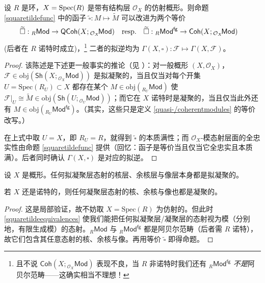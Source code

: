 \begin{Pro}\label{squaretildefunctocoherent}
设 $R$ 是环，$X=\textup{Spec}(R)$ 是带有结构层 $\mathcal{O}_X$ 的仿射概形。则命题 \ref{squaretildefunc} 中的函子 $\widetilde{\square}:M\mapsto\widetilde{M}$ 可以改进为两个等价
\begin{equation}\label{squaretildeequivalences}
	\mkern-18mu\widetilde{\square}:{}_R\mathsf{Mod}\rightarrow\mathsf{QCoh}(X;{}_{\mathcal{O}_X}\!\mathsf{Mod})\quad\text{resp.}\quad \widetilde{\square}:{}_R\mathsf{Mod}^\mathsf{fg}\rightarrow\mathsf{Coh}(X;{}_{\mathcal{O}_X}\!\mathsf{Mod})
\end{equation}
\textup(后者在 $R$ 诺特时成立\textup)，\footnote{且不说 $\mathsf{Coh}(X;{}_{\mathcal{O}_X}\!\mathsf{Mod})$ 表现不良，当 $R$ 非诺特时我们还有 ${}_R\mathsf{Mod}^\mathsf{fg}$ \textit{不是}阿贝尔范畴——这确实相当不理想！} 二者的拟逆均为 $\Gamma(X,\square):\mathcal{F}\mapsto\Gamma(X,\mathcal{F})$。
\end{Pro}  

\begin{proof}
该陈述是下述更一般事实的推论（见 \cite[命题 II.5.4]{[Har77]}）：对一般概形 $(X,\mathcal{O}_X)$，$\mathcal{F}\in\text{obj}(\mathsf{Sh}(X;{}_{\mathcal{O}_X}\!\mathsf{Mod}))$ 是拟凝聚的，当且仅当对每个开集 $U=\text{Spec}(R_U)\subset X$ 都存在某个 $M\in\text{obj}({}_{R_U}\!\mathsf{Mod})$ 使 $\mathcal{F}|_U\cong\widetilde{M}\in\text{obj}(\mathsf{Sh}(U;{}_{\mathcal{O}_U}\!\mathsf{Mod}))$；而它在 $X$ 诺特时是凝聚的，当且仅当此外还有 $M\in\text{obj}({}_{R_U}\!\mathsf{Mod}^\mathsf{fg})$。（其实，这些只是定义 \ref{quasi-/coherentmodules} 的等价改写。）

在上式中取 $U=X$，即 $R_U=R$，就得到 $\widetilde{\square}$ 的本质满性；而 $\mathcal{O}_X$-模态射层面的全忠实性由命题 \ref{squaretildefunc} 提供（回忆：函子是等价当且仅当它全忠实且本质满）。后者同时确认 $\Gamma(X,\square)$ 是对应的拟逆。  
\end{proof}

\begin{Pro}\label{cokernelscoherent}
设 $X$ 是概形。任何拟凝聚层态射的核层、余核层与像层本身都是拟凝聚的。 

若 $X$ 还是诺特的，则任何凝聚层态射的核、余核与像也都是凝聚的。
\end{Pro}

\begin{proof}
这是局部验证，故不妨取 $X=\text{Spec}(R)$ 为仿射的。但此时 \eqref{squaretildeequivalences} 使我们能把任何拟凝聚层/凝聚层的态射视为模（分别地，有限生成模）的态射。${}_R\mathsf{Mod}$ 与 ${}_R\mathsf{Mod}^\mathsf{fg}$ 都是阿贝尔范畴（后者需 $R$ 诺特），故它们包含其任意态射的核、余核与像。再用等价 $\widetilde{\square}$ 即得命题。  
\end{proof}

